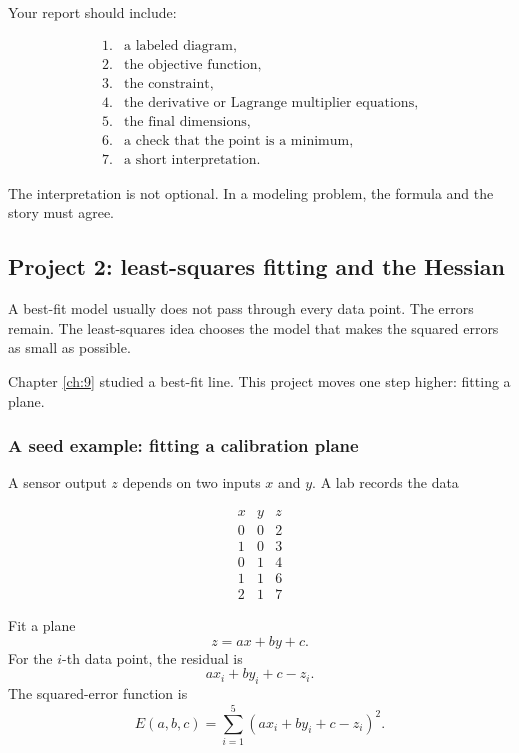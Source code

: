 Your report should include:

\[
\begin{array}{ll}
1. & \text{a labeled diagram,}\\
2. & \text{the objective function,}\\
3. & \text{the constraint,}\\
4. & \text{the derivative or Lagrange multiplier equations,}\\
5. & \text{the final dimensions,}\\
6. & \text{a check that the point is a minimum,}\\
7. & \text{a short interpretation.}
\end{array}
\]

The interpretation is not optional.  In a modeling problem, the formula and the story
must agree.

\subsection{Project 2: least-squares fitting and the Hessian}

A best-fit model usually does not pass through every data point.  The errors remain.
The least-squares idea chooses the model that makes the squared errors as small as
possible.

Chapter \ref{ch:9} studied a best-fit line.  This project moves one step higher: fitting a
plane.

\subsubsection*{A seed example: fitting a calibration plane}

A sensor output \(z\) depends on two inputs \(x\) and \(y\).  A lab records the data

\[
\begin{array}{c|c|c}
x & y & z \\ \hline
0 & 0 & 2\\
1 & 0 & 3\\
0 & 1 & 4\\
1 & 1 & 6\\
2 & 1 & 7
\end{array}
\]

Fit a plane
\[
\boxed{
    z=ax+by+c.
}
\]
For the \(i\)-th data point, the residual is
\[
    ax_i+by_i+c-z_i.
\]
The squared-error function is
\[
\boxed{
    E(a,b,c)=\sum_{i=1}^5(ax_i+by_i+c-z_i)^2.
}
\]


